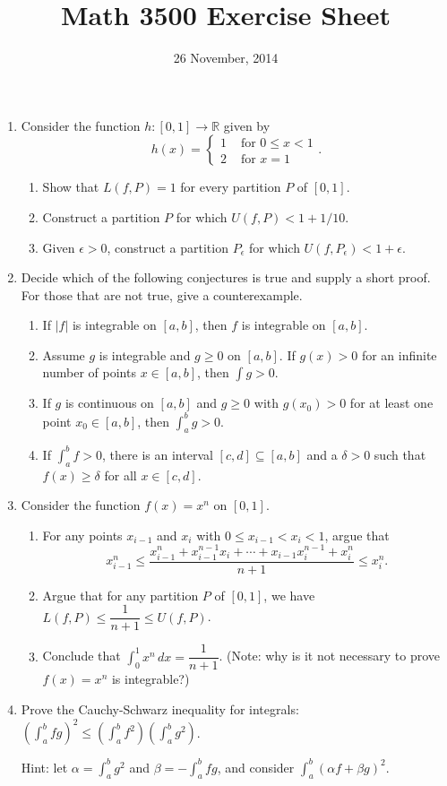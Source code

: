 \documentclass[letterpaper,12pt]{article}
\title{Math 3500 Exercise Sheet}
\date{26 November, 2014}
\newcommand{\R}{\mathbb{R}}
\newcommand{\abs}[1]{\lvert #1\rvert}
\begin{document}
\maketitle

\begin{enumerate}
 \item Consider the function $h:[0,1]\to\R$ given by
\[
 h(x) = \begin{cases}1& \text{ for } 0\leq x<1\\ 2& \text{ for } x=1\end{cases}.
\]
\begin{enumerate}
 \item Show that $L(f,P)=1$ for every partition $P$ of $[0,1]$.
 \item Construct a partition $P$ for which $U(f,P)<1+1/10$.
 \item Given $\epsilon>0$, construct a partition $P_\epsilon$ for which $U(f,P_\epsilon)<1+\epsilon$.
\end{enumerate}
 \item Decide which of the following conjectures is true and supply a short proof. For those that are not true, give a counterexample.
\begin{enumerate}
 \item If $\abs{f}$ is integrable on $[a,b]$, then $f$ is integrable on $[a,b]$.
 \item Assume $g$ is integrable and $g\geq 0$ on $[a,b]$. If $g(x)>0$ for an infinite number of points $x\in [a,b]$, then $\int g>0$.
 \item If $g$ is continuous on $[a,b]$ and $g\geq 0$ with $g(x_0)>0$ for at least one point $x_0\in [a,b]$, then $\int_a^bg>0$.
 \item If $\int_a^bf>0$, there is an interval $[c,d]\subseteq [a,b]$ and a $\delta>0$ such that $f(x)\geq \delta$ for all $x\in [c,d]$.
\end{enumerate}
 \item Consider the function $f(x)=x^n$ on $[0,1]$.
\begin{enumerate}
 \item For any points $x_{i-1}$ and $x_i$ with $0\leq x_{i-1}<x_i<1$, argue that
\[
 x_{i-1}^n \leq \frac{x_{i-1}^n+x_{i-1}^{n-1}x_i + \cdots + x_{i-1}x_i^{n-1}+x_i^n}{n+1}\leq x_i^n.
\]
 \item Argue that for any partition $P$ of $[0,1]$, we have $L(f,P)\leq \dfrac{1}{n+1}\leq U(f,P)$.
 \item Conclude that $\int_0^1 x^n \,dx = \dfrac{1}{n+1}$. (Note: why is it not necessary to prove $f(x)=x^n$ is integrable?)
\end{enumerate}
\item Prove the Cauchy-Schwarz inequality for integrals: $\left(\int_a^b fg\right)^2 \leq \left(\int_a^b f^2\right)\left(\int_a^b g^2\right)$.

Hint: let $\alpha = \int_a^b g^2$ and $\beta = -\int_a^b fg$, and consider $\int_a^b(\alpha f+\beta g)^2$.
\end{enumerate}
\end{document}
